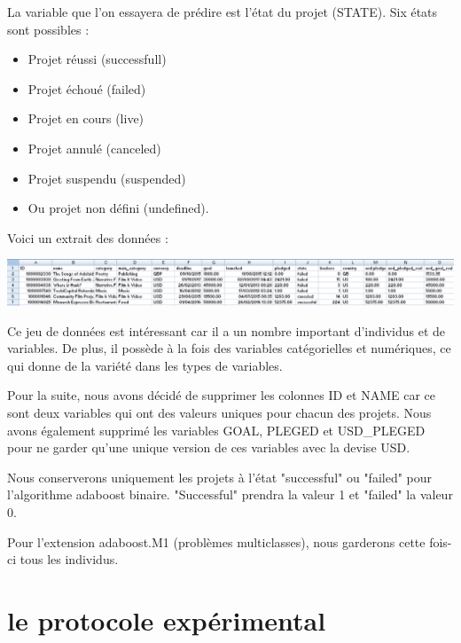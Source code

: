 \documentclass{article}
\begin{document}
\noindent La variable que l'on essayera de prédire est l'état du projet (STATE). Six états sont possibles :

\begin{itemize}
    \item Projet réussi (successfull)
    \item Projet échoué (failed)
    \item Projet en cours (live)
    \item Projet annulé (canceled)
    \item Projet suspendu (suspended)
    \item Ou projet non défini (undefined).\newline 
\end{itemize}

\noindent Voici un extrait des données :

\begin{center} \includegraphics[scale=0.55]{extrait_donnees.PNG} \end{center}
\noindent Ce jeu de données est intéressant car il a un nombre important d'individus et de variables. De plus, il possède à la fois des variables catégorielles et numériques, ce qui donne de la variété dans les types de variables. \newline

\noindent Pour la suite, nous avons décidé de supprimer les colonnes ID et NAME car ce sont deux variables qui ont des valeurs uniques pour chacun des projets. Nous avons également supprimé les variables GOAL, PLEGED et USD\_PLEGED pour ne garder qu'une unique version de ces variables avec la devise USD.\newline

\noindent Nous conserverons uniquement les projets à l'état "successful" ou "failed" pour l'algorithme adaboost binaire. "Successful" prendra la valeur 1 et "failed" la valeur 0.\newline

\noindent Pour l'extension adaboost.M1 (problèmes multiclasses), nous garderons cette fois-ci tous les individus.


\section{le protocole expérimental}
\end{document}

